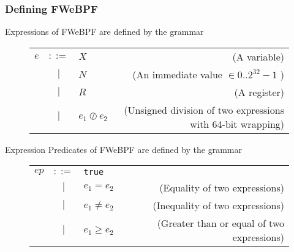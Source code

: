 



\subsubsection{Defining FWeBPF}


Expressions of FWeBPF are defined by the grammar
\begin{figure}[H]
  \centering
  \begin{tabular}{lclr}
    $e$ & $::=$ & $X$ & (A variable) \\
      & $|$ & $N$ & (An immediate value $\in 0..2^{32}-1$ ) \\
      & $|$ & $R$ & (A register) \\
      & $|$ & $e_1 \oslash e_2$ & (Unsigned division of two expressions with 64-bit wrapping) \\    
\end{tabular}    
\end{figure}

Expression Predicates of FWeBPF are defined by the grammar
\begin{figure}[H]
  \centering
  \begin{tabular}{lclr}
    $ep$ & $::=$ & \texttt{true} & \\
     & $|$ & $e_1 = e_2$ & (Equality of two expressions) \\    
     & $|$ & $e_1 \neq e_2$ & (Inequality of two expressions) \\
     & $|$ &  $e_1 \geq e_2$ & (Greater than or equal of two expressions) \\
\end{tabular}    
\end{figure}


